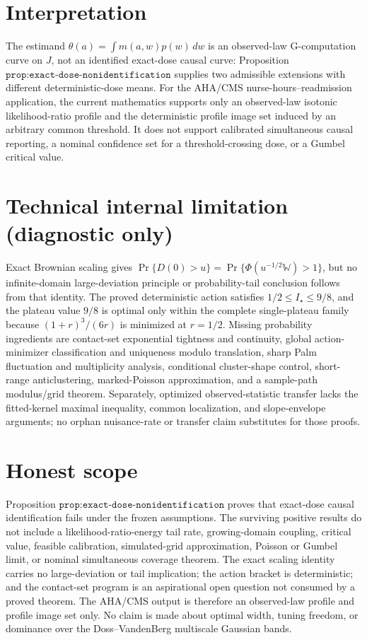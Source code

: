 \documentclass{article}
\begin{document}
\section{Interpretation}

The estimand \(\theta(a)=\int m(a,w)p(w)\,dw\) is an observed-law G-computation curve on \(J\), not an identified exact-dose causal curve: Proposition \(\texttt{prop:exact-dose-nonidentification}\) supplies two admissible extensions with different deterministic-dose means. For the AHA/CMS nurse-hours--readmission application, the current mathematics supports only an observed-law isotonic likelihood-ratio profile and the deterministic profile image set induced by an arbitrary common threshold. It does not support calibrated simultaneous causal reporting, a nominal confidence set for a threshold-crossing dose, or a Gumbel critical value.

\section*{Technical internal limitation (diagnostic only)}

Exact Brownian scaling gives \(\Pr\{D(0)>u\}=\Pr\{\Phi(u^{-1/2}\mathbb W)>1\}\), but no infinite-domain large-deviation principle or probability-tail conclusion follows from that identity. The proved deterministic action satisfies \(1/2\le I_\star\le9/8\), and the plateau value \(9/8\) is optimal only within the complete single-plateau family because \((1+r)^3/(6r)\) is minimized at \(r=1/2\). Missing probability ingredients are contact-set exponential tightness and continuity, global action-minimizer classification and uniqueness modulo translation, sharp Palm fluctuation and multiplicity analysis, conditional cluster-shape control, short-range anticlustering, marked-Poisson approximation, and a sample-path modulus/grid theorem. Separately, optimized observed-statistic transfer lacks the fitted-kernel maximal inequality, common localization, and slope-envelope arguments; no orphan nuisance-rate or transfer claim substitutes for those proofs.

\section{Honest scope}

Proposition \(\texttt{prop:exact-dose-nonidentification}\) proves that exact-dose causal identification fails under the frozen assumptions. The surviving positive results do not include a likelihood-ratio-energy tail rate, growing-domain coupling, critical value, feasible calibration, simulated-grid approximation, Poisson or Gumbel limit, or nominal simultaneous coverage theorem. The exact scaling identity carries no large-deviation or tail implication; the action bracket is deterministic; and the contact-set program is an aspirational open question not consumed by a proved theorem. The AHA/CMS output is therefore an observed-law profile and profile image set only. No claim is made about optimal width, tuning freedom, or dominance over the Doss--VandenBerg multiscale Gaussian bands.
\end{document}
